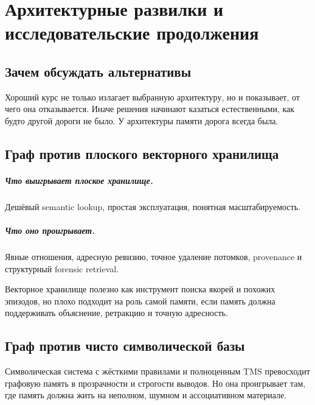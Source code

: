 \chapter{Архитектурные развилки и исследовательские продолжения}
\label{ch:tradeoffs}

\section{Зачем обсуждать альтернативы}

Хороший курс не только излагает выбранную архитектуру, но и показывает, от чего она
отказывается. Иначе решения начинают казаться естественными, как будто другой дороги
не было. У архитектуры памяти дорога всегда была.

\section{Граф против плоского векторного хранилища}

\paragraph{Что выигрывает плоское хранилище.}
Дешёвый semantic lookup, простая эксплуатация, понятная масштабируемость.

\paragraph{Что оно проигрывает.}
Явные отношения, адресную ревизию, точное удаление потомков, provenance и
структурный forensic retrieval.

\begin{principle}
Векторное хранилище полезно как инструмент поиска якорей и похожих эпизодов, но
плохо подходит на роль самой памяти, если память должна поддерживать объяснение,
ретракцию и точную адресность.
\end{principle}

\section{Граф против чисто символической базы}

Символическая система с жёсткими правилами и полноценным TMS превосходит графовую
память в прозрачности и строгости выводов. Но она проигрывает там, где память должна
жить на неполном, шумном и ассоциативном материале.

